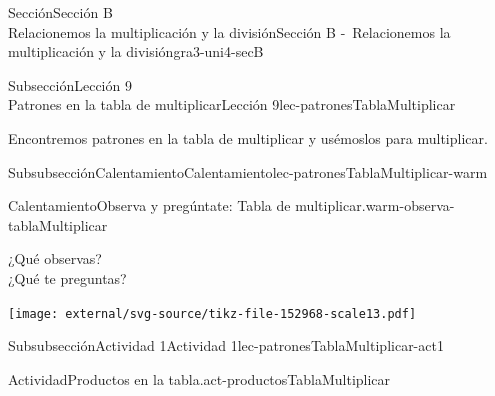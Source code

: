 \begin{sectionptx}{Sección}{{\Large Sección B\\}Relacionemos la multiplicación y la división}{}{Sección B -~Relacionemos la multiplicación y la división}{}{}{gra3-uni4-secB}
%
\clearpage
\begin{subsectionptx}{Subsección}{{\normalsize Lección 9\\[-0.05cm]}Patrones en la tabla de multiplicar}{}{Lección 9}{}{}{lec-patronesTablaMultiplicar}
\begin{introduction}{}%
Encontremos patrones en la tabla de multiplicar y usémoslos para multiplicar.%
\end{introduction}%
%
%
\typeout{************************************************}
\typeout{************************************************}
%
\begin{subsubsectionptx}{Subsubsección}{Calentamiento}{}{Calentamiento}{}{}{lec-patronesTablaMultiplicar-warm}
\begin{exploration}{Calentamiento}{Observa y pregúntate: Tabla de multiplicar.}{warm-observa-tablaMultiplicar}%
\begin{sidebyside}{2}{0}{0}{0.05}%
\begin{sbspanel}{0.3}%
¿Qué observas?\\
 ¿Qué te preguntas?%
\end{sbspanel}%
\begin{sbspanel}{0.7}%
\begin{image}{0}{1}{0}{}%
\texttt{[image: external/svg-source/tikz-file-152968-scale13.pdf]}
\end{image}%
\end{sbspanel}%
\end{sidebyside}%
\end{exploration}%
\end{subsubsectionptx}
%
%
\typeout{************************************************}
\typeout{************************************************}
%
\begin{subsubsectionptx}{Subsubsección}{Actividad 1}{}{Actividad 1}{}{}{lec-patronesTablaMultiplicar-act1}
\begin{activity}{Actividad}{Productos en la tabla.}{act-productosTablaMultiplicar}%

\end{activity}
\end{subsubsectionptx}
\end{subsectionptx}
\end{sectionptx}
